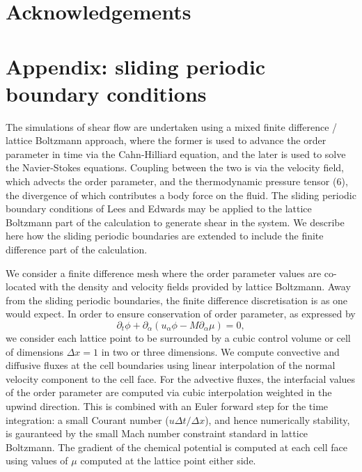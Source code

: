 \documentclass[8.5pt,twoside,twocolumn]{article}
\begin{document}
\section{Acknowledgements}


\section{Appendix: sliding periodic boundary conditions}

The simulations of shear flow are undertaken using a mixed finite
difference / lattice Boltzmann approach, where the former is used
to advance the order parameter in time via the Cahn-Hilliard equation,
and the later is used to solve the Navier-Stokes equations.
Coupling between the two is
via the velocity field, which advects the order parameter, and
the thermodynamic pressure tensor (6), the divergence of which
contributes a body force on the fluid. The sliding periodic
boundary conditions of Lees and Edwards\cite{leesedwards} may be
applied to the lattice Boltzmann part of the calculation
\cite{wagnerpagonabarraga,adhikari2005} to generate shear in the system. We
describe here how the sliding periodic boundaries are extended to
include the finite difference part of the calculation.

We consider a finite difference mesh where the order parameter
values are co-located with the density and velocity fields provided
by lattice Boltzmann. Away from the sliding periodic boundaries, the
finite difference discretisation is as one would expect.
In order to ensure conservation of order parameter, as expressed by
\begin{equation}
\partial_t \phi + \partial_\alpha (u_\alpha \phi - M\partial_\alpha \mu) = 0,
\end{equation}
we consider each lattice point to be surrounded by a cubic control volume or
cell
of dimensions $\Delta x = 1$ in two or three dimensions.
We compute convective and diffusive fluxes at the cell boundaries using
linear interpolation of the normal velocity component to the cell face.
For the advective fluxes, the interfacial values of the order parameter
are computed via cubic interpolation weighted in the upwind direction.
This is combined with an Euler forward step for the time integration:
a small Courant number ($u\Delta t/\Delta x$), and hence numerically
stability, is gauranteed by the small Mach number constraint
standard in lattice Boltzmann. The gradient of the chemical potential
is computed at each cell face using values of $\mu$ computed at the
lattice point either side.
\end{document}

